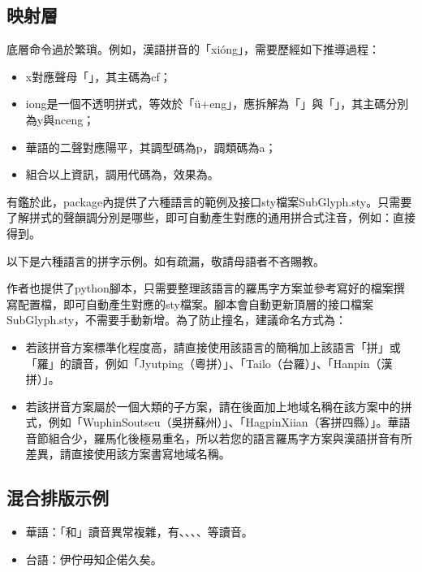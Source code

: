 \subsection{映射層}
底層命令過於繁瑣。例如，漢語拼音的「xióng」，需要歷經如下推導過程：
\begin{itemize}
	\item x對應聲母「」，其主碼為cf；
	\item iong是一個不透明拼式，等效於「ü+eng」，應拆解為「」與「」，其主碼分別為y與nceng；
	\item 華語的二聲對應陽平，其調型碼為p，調類碼為a；
	\item 組合以上資訊，調用代碼為，效果為。
\end{itemize}
有鑑於此，package內提供了六種語言的範例及接口sty檔案SubGlyph.sty。只需要了解拼式的聲韻調分別是哪些，即可自動產生對應的通用拼合式注音，例如：直接得到。\par
以下是六種語言的拼字示例。如有疏漏，敬請母語者不吝賜教。\par
%
作者也提供了python腳本，只需要整理該語言的羅馬字方案並參考寫好的檔案撰寫配置檔，即可自動產生對應的sty檔案。腳本會自動更新頂層的接口檔案SubGlyph.sty，不需要手動新增\detokenize{\usepackage{SGYoursystem.sty}}。為了防止撞名，建議命名方式為：\par
\begin{itemize}
	\item 若該拼音方案標準化程度高，請直接使用該語言的簡稱加上該語言「拼」或「羅」的讀音，例如「Jyutping（粵拼）」、「Tailo（台羅）」、「Hanpin（漢拼）」。
	\item 若該拼音方案屬於一個大類的子方案，請在後面加上地域名稱在該方案中的拼式，例如「WuphinSoutseu（吳拼蘇州）」、「HagpinXiian（客拼四縣）」。華語音節組合少，羅馬化後極易重名，所以若您的語言羅馬字方案與漢語拼音有所差異，請直接使用該方案書寫地域名稱。
\end{itemize}

\subsection{混合排版示例}
\begin{itemize}
	\item 華語：「和」讀音異常複雜，有、、、、等讀音。
	\item 台語：伊佇毋知企偌久矣。
\end{itemize}

\clearpage